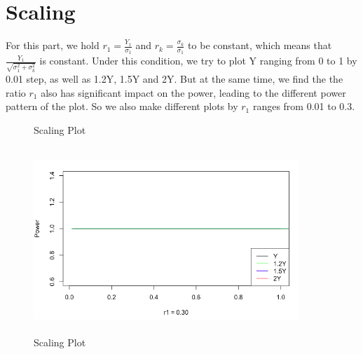 \documentclass[10pt,english]{article}\usepackage{graphicx, color}
\numberwithin{equation}{section}
\numberwithin{figure}{section}
\begin{document}
\section{Scaling}
For this part, we hold $r_1=\frac{Y_1}{\sigma_1}$ and $r_k=\frac{\sigma_k}{\sigma_1}$ to be constant, which means that $\frac{Y_1}{\sqrt{\sigma_1^2+\sigma_k^2}}$ is constant. Under this condition, we try to plot Y ranging from 0 to 1 by 0.01 step, as well as 1.2Y, 1.5Y and 2Y. But at the same time, we find the the ratio $r_1$ also has significant impact on the power, leading to the different power pattern of the plot. So we also make different plots by $r_1$ ranges from 0.01 to 0.3.\\
\begin{figure}[htbp]
\centering{}
\caption{Scaling Plot}
\end{figure}
\begin{figure}[htbp]
\centering\includegraphics[width=10cm,height=7cm]{sca3}
\caption{\label{1}Scaling Plot}
\end{figure}
\end{document}
